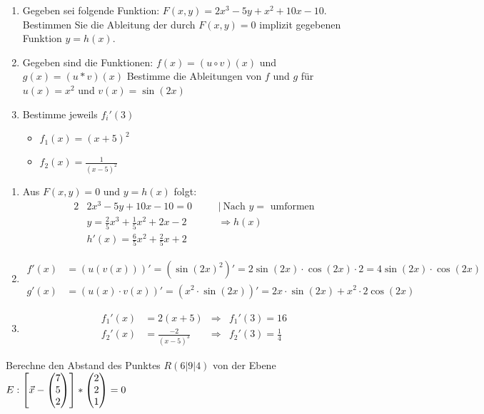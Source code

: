 \begin{enumerate}
	\item Gegeben sei folgende Funktion: $F(x,y)=2x^3-5y+x^2+10x-10$. Bestimmen Sie die Ableitung der durch $F(x,y)=0$ implizit gegebenen Funktion $y=h(x)$.
	\item Gegeben sind die Funktionen:
	$f(x) = (u \circ v)(x)$ und $g(x) = (u* v)(x)$
	Bestimme die Ableitungen von $f$ und $g$ für $u(x)=x^2$ und $v(x)=\sin(2x)$
	\item Bestimme jeweils $f_i'(3)$
	\begin{itemize}
		\item $f_1(x) = (x+5)^2$
		\item $f_2(x) = \frac{1}{(x-5)^2}$
	\end{itemize}
\end{enumerate}
\begin{lsg}{}
	\begin{enumerate}
		\item Aus $F(x,y)=0$ und $y=h(x)$ folgt:\begin{alignat*}{2}
		&2x^3-5y+10x-10=0\quad&&|\ \text{Nach $y=$ umformen}\\
		&y=\frac{2}{5} x^3+\frac{1}{5} x^2+2x-2 &&\Rightarrow h(x)\\
		&h'(x)=\frac{6}{5} x^2+\frac{2}{5}x+2
		\end{alignat*}
		\item \begin{align*}
		f'(x)&=\left(u(v(x))\right)'=\left({\sin(2x)}^2\right)'=2\sin(2x)\cdot \cos(2x) \cdot 2=4\sin(2x)\cdot \cos(2x)\\
		g'(x)&=(u(x)\cdot v(x))'=\left(x^2\cdot \sin(2x)\right)'=2x\cdot \sin(2x)+x^2\cdot 2\cos(2x)
		\end{align*}
		\item \begin{align*}
		f_1'(x)&=2(x+5)&\Rightarrow  &f_1'(3)=16\\
		f_2'(x)&=\frac{-2}{(x-5)^3}&\Rightarrow &f_2'(3)=\frac{1}{4}
		\end{align*}
	\end{enumerate}
\end{lsg}


Berechne den Abstand des Punktes $R(6|9|4)$ von der Ebene $E: \left[ \vec x -  \begin{pmatrix} 7 \\ 5\\ 2 \end{pmatrix}\right]*\begin{pmatrix} 2\\ 2 \\1 \end{pmatrix}=0$



